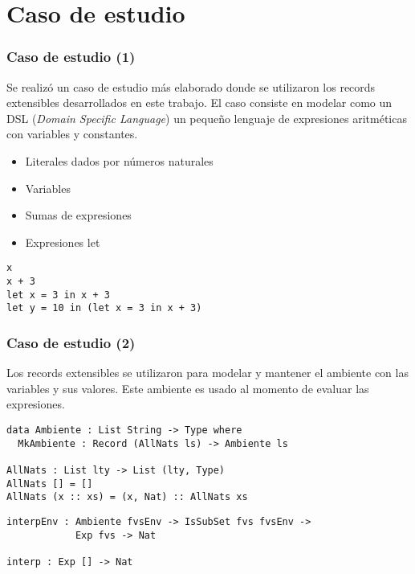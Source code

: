 \documentclass{beamer}
\begin{document}
\section{Caso de estudio}

\begin{frame}[fragile]
\frametitle{Caso de estudio (1)}

Se realizó un caso de estudio más elaborado donde se utilizaron los records extensibles desarrollados en este trabajo. El caso consiste en modelar como un DSL (\textit{Domain Specific Language}) un pequeño lenguaje de expresiones aritméticas con variables y constantes.


\begin{itemize}
\item Literales dados por números naturales
\item Variables
\item Sumas de expresiones
\item Expresiones let
\end{itemize}

\begin{example}
\begin{verbatim}
x
x + 3
let x = 3 in x + 3
let y = 10 in (let x = 3 in x + 3)
\end{verbatim}
\end{example}
\end{frame}

\begin{frame}[fragile]
\frametitle{Caso de estudio (2)}

Los records extensibles se utilizaron para modelar y mantener el ambiente con las variables y sus valores. Este ambiente es usado al momento de evaluar las expresiones.

\begin{example}
\begin{verbatim}
data Ambiente : List String -> Type where
  MkAmbiente : Record (AllNats ls) -> Ambiente ls

AllNats : List lty -> List (lty, Type)
AllNats [] = []
AllNats (x :: xs) = (x, Nat) :: AllNats xs
\end{verbatim}
\end{example}

\begin{example}
\begin{verbatim}
interpEnv : Ambiente fvsEnv -> IsSubSet fvs fvsEnv -> 
            Exp fvs -> Nat

interp : Exp [] -> Nat
\end{verbatim}
\end{example}
\end{frame}
\end{document}

